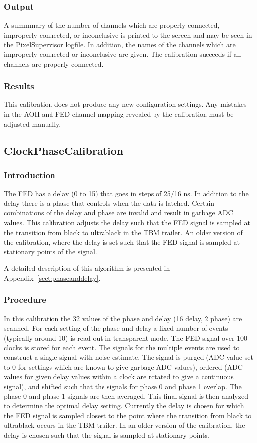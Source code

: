 \subsubsection{Output}
A summmary of the number of channels which are properly connected, improperly connected, or inconclusive is printed to the screen and may be seen in the PixelSupervisor logfile.  In addition, the names of the channels which are improperly connected or inconclusive are given.  The calibration succeeds if all channels are properly connected.

\subsubsection{Results}
This calibration does not produce any new configuration settings.  Any mistakes in the AOH and FED channel mapping revealed by the calibration must be adjusted manually. 

\subsection{ClockPhaseCalibration}
\label{sec:ClockPhaseCalibration}

\subsubsection{Introduction}
The FED has a delay (0 to 15) that goes in steps of 25/16 ns. In addition to the delay there is a phase that controls when the data is latched. Certain combinations of the delay and phase are invalid and result in garbage ADC values. This calibration adjusts the delay such that the FED signal is sampled at the transition from black to ultrablack in the TBM trailer.  An older version of the calibration, where the delay is set such that the FED signal is sampled at stationary points of the signal. 

A detailed description of this algorithm is presented in Appendix~\ref{sect:phaseanddelay}.

\subsubsection{Procedure}
 In this calibration the 32 values of the phase and delay (16 delay, 2 phase) are scanned. For each setting of the phase and delay a fixed number of events (typically around 10) is read out in transparent mode. The FED signal over 100 clocks is stored for each event. The signals for the multiple events are used to construct a single signal with noise estimate. The signal is purged (ADC value set to 0 for settings which are known to give garbage ADC values), ordered (ADC values for given delay values within a clock are rotated to give a continuous signal), and shifted such that the signals for phase 0 and phase 1 overlap. The phase 0 and phase 1 signals are then averaged. This final signal is then analyzed to determine the optimal delay setting.  Currently the delay is chosen for which the FED signal is sampled closest to the point where the transition from black to ultrablack occurs in the TBM trailer. In an older version of the calibration, the delay is chosen such that the signal is sampled at stationary points.

